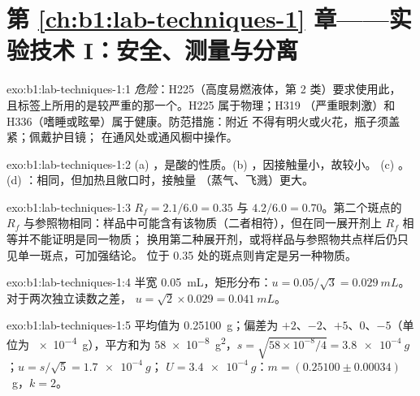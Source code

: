 \section*{第 \ref{ch:b1:lab-techniques-1} 章——实验技术 I：安全、测量与分离}

\begin{solution}{exo:b1:lab-techniques-1:1}
\emph{危险}：H225（高度易燃液体，第 2 类）要求使用此，
且标签上所用的是较严重的那一个。H225 属于物理；H319
（严重眼刺激）和 H336（嗜睡或眩晕）属于健康。防范措施：附近
不得有明火或火花，瓶子须盖紧；佩戴护目镜；
在通风处或通风橱中操作。
\end{solution}

\begin{solution}{exo:b1:lab-techniques-1:2}
(a) ，是酸的性质。(b) ，因接触量小，故较小。
(c) 。(d) ：相同，但加热且敞口时，接触量
（蒸气、飞溅）更大。
\end{solution}

\begin{solution}{exo:b1:lab-techniques-1:3}
$R_f = 2.1/6.0 = 0.35$ 与 $4.2/6.0 = 0.70$。第二个斑点的 $R_f$
与参照物相同：样品中可能含有该物质（二者相符），但在同一展开剂上
$R_f$ 相等并不能证明是同一物质；
换用第二种展开剂，或将样品与参照物共点样后仍只见单一斑点，可加强结论。
位于 0.35 处的斑点则肯定是另一种物质。
\end{solution}

\begin{solution}{exo:b1:lab-techniques-1:4}
半宽 \qty{0.05}{mL}，矩形分布：$u = 0.05/\sqrt3 = \qty{0.029}{mL}$。
对于两次独立读数之差，
$u = \sqrt{2} \times 0.029 = \qty{0.041}{mL}$。
\end{solution}

\begin{solution}{exo:b1:lab-techniques-1:5}
平均值为 \qty{0.25100}{g}；偏差为 $+2$、$-2$、$+5$、0、$-5$（单位为
\qty{e-4}{g}），平方和为 \qty{58e-8}{g^2}，$s = \sqrt{58 \times
10^{-8}/4} = \qty{3.8e-4}{g}$；$u = s/\sqrt5 = \qty{1.7e-4}{g}$；
$U = \qty{3.4e-4}{g}$：$m = (0.25100 \pm 0.00034)$~g，$k = 2$。
\end{solution}

